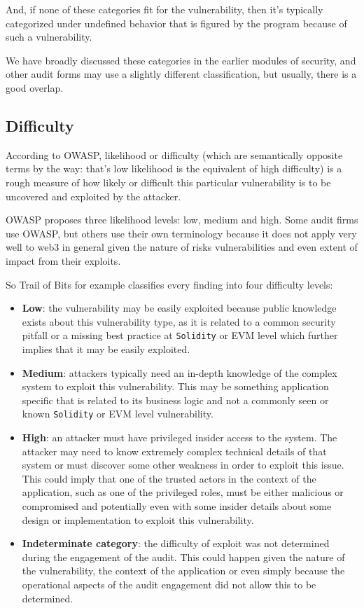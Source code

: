 And, if none of these categories fit for the vulnerability, then it's
typically categorized under undefined behavior that is figured by the
program because of such a vulnerability.

We have broadly discussed these categories in the earlier modules of
security, and other audit forms may use a slightly different
classification, but usually, there is a good overlap.

\subsection{Difficulty}\label{difficulty}

According to OWASP, likelihood or difficulty (which are semantically
opposite terms by the way: that's low likelihood is the equivalent of
high difficulty) is a rough measure of how likely or difficult this
particular vulnerability is to be uncovered and exploited by the
attacker.

OWASP proposes three likelihood levels: low, medium and high. Some audit
firms use OWASP, but others use their own terminology because it does
not apply very well to web3 in general given the nature of risks
vulnerabilities and even extent of impact from their exploits.

So Trail of Bits for example classifies every finding into four
difficulty levels:

\begin{itemize}
\tightlist
\item
  \textbf{Low}: the vulnerability may be easily exploited because public
  knowledge exists about this vulnerability type, as it is related to a
  common security pitfall or a missing best practice at
  \texttt{Solidity} or EVM level which further implies that it may be
  easily exploited.
\item
  \textbf{Medium}: attackers typically need an in-depth knowledge of the
  complex system to exploit this vulnerability. This may be something
  application specific that is related to its business logic and not a
  commonly seen or known \texttt{Solidity} or EVM level vulnerability.
\item
  \textbf{High}: an attacker must have privileged insider access to the
  system. The attacker may need to know extremely complex technical
  details of that system or must discover some other weakness in order
  to exploit this issue. This could imply that one of the trusted actors
  in the context of the application, such as one of the privileged
  roles, must be either malicious or compromised and potentially even
  with some insider details about some design or implementation to
  exploit this vulnerability.
\item
  \textbf{Indeterminate category}: the difficulty of exploit was not
  determined during the engagement of the audit. This could happen given
  the nature of the vulnerability, the context of the application or
  even simply because the operational aspects of the audit engagement
  did not allow this to be determined.
\end{itemize}

